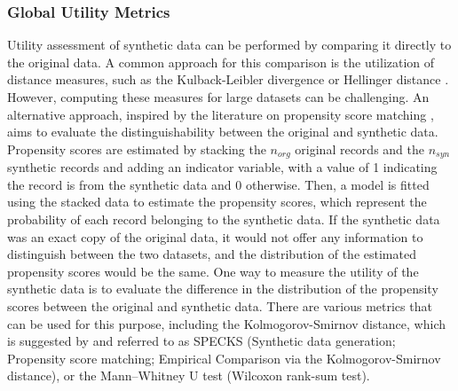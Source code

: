 \subsubsection{Global Utility Metrics}
\label{subsubsec:global}
Utility assessment of synthetic data can be performed by comparing it directly to the original data. A common approach for this comparison is the utilization of distance measures, such as the Kulback-Leibler divergence \citep{karr2006framework} or Hellinger distance \citep{gomatam2003distortion}. However, computing these measures for large datasets can be challenging. An alternative approach, inspired by the literature on propensity score matching \citep{rosenbaum1983central}, aims to evaluate the distinguishability between the original and synthetic data. Propensity scores are estimated by stacking the $n_{org}$ original records and the $n_{syn}$ synthetic records and adding an indicator variable, with a value of 1 indicating the record is from the synthetic data and $0$ otherwise. Then, a model is fitted using the stacked data to estimate the propensity scores, which represent the probability of each record belonging to the synthetic data. If the synthetic data was an exact copy of the original data, it would not offer any information to distinguish between the two datasets, and the distribution of the estimated propensity scores would be the same. One way to measure the utility of the synthetic data is to evaluate the difference in the distribution of the propensity scores between the original and synthetic data. There are various metrics that can be used for this purpose, including the Kolmogorov-Smirnov distance, which is suggested by \citet{mckay2018differentially} and referred to as SPECKS (Synthetic data generation; Propensity score matching; Empirical Comparison via the Kolmogorov-Smirnov distance), or the Mann–Whitney U test (Wilcoxon rank-sum test).

